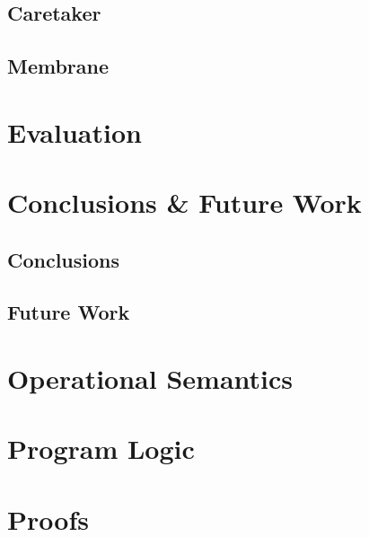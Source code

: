 \documentclass[a4paper,notitlepage]{report}
\begin{document}
\section{Caretaker}
\section{Membrane}

\chapter{Evaluation}
\chapter{Conclusions \& Future Work}
\section{Conclusions}
\section{Future Work}




\appendix
\chapter{Operational Semantics}
\chapter{Program Logic}
\chapter{Proofs}
\end{document}
